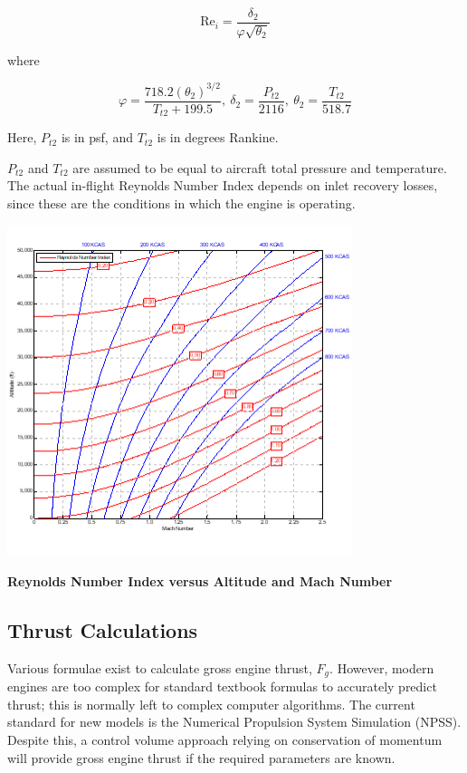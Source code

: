 \documentclass[
]{book}
\begin{document}
\[\mathrm{Re}_{i} = \frac{\delta_{2}}{\varphi\sqrt{\theta_{2}}}\]

where

\[\varphi = \frac{718.2\left( \theta_{2} \right)^{3/2}}{T_{t2} + 199.5},\ \delta_{2} = \frac{P_{t2}}{2116},\ \theta_{2} = \frac{T_{t2}}{518.7}\]

Here, \(P_{t2}\) is in psf, and \(T_{t2}\) is in degrees Rankine.

\(P_{t2}\) and \(T_{t2}\) are assumed to be equal to aircraft total pressure
and temperature. The actual in-flight Reynolds Number Index depends on inlet
recovery losses, since these are the conditions in which the engine is operating.

\includegraphics[width=3.9658in,height=3.79851in]{media/17/image13.png}

\textbf{Reynolds Number Index versus Altitude and Mach Number}

\hypertarget{thrust-calculations}{%
\subsection{Thrust Calculations}\label{thrust-calculations}}

Various formulae exist to calculate gross engine thrust, \(F_g\). However,
modern engines are too complex for standard textbook formulas to accurately
predict thrust; this is normally left to complex computer algorithms. The
current standard for new models is the Numerical Propulsion System Simulation
(NPSS). Despite this, a control volume approach relying on conservation of
momentum will provide gross engine thrust if the required parameters are known.
\end{document}
